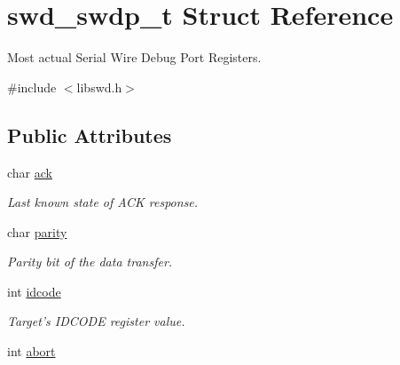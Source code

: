 \hypertarget{structswd__swdp__t}{
\section{swd\_\-swdp\_\-t Struct Reference}
\label{structswd__swdp__t}
}


Most actual Serial Wire Debug Port Registers.  




{\ttfamily \#include $<$libswd.h$>$}

\subsection*{Public Attributes}
\begin{DoxyCompactItemize}
\item 
\hypertarget{structswd__swdp__t_a070bf19c81fcf7467cf56b25d0e5a4cf}{
char \hyperlink{structswd__swdp__t_a070bf19c81fcf7467cf56b25d0e5a4cf}{ack}}
\label{structswd__swdp__t_a070bf19c81fcf7467cf56b25d0e5a4cf}

\begin{DoxyCompactList}\small\item\em Last known state of ACK response. \item\end{DoxyCompactList}\item 
\hypertarget{structswd__swdp__t_ad2b92d409367acae0566fbd5be7a8ea5}{
char \hyperlink{structswd__swdp__t_ad2b92d409367acae0566fbd5be7a8ea5}{parity}}
\label{structswd__swdp__t_ad2b92d409367acae0566fbd5be7a8ea5}

\begin{DoxyCompactList}\small\item\em Parity bit of the data transfer. \item\end{DoxyCompactList}\item 
\hypertarget{structswd__swdp__t_a59d78f5e5b3b2576a1ea04720bafb310}{
int \hyperlink{structswd__swdp__t_a59d78f5e5b3b2576a1ea04720bafb310}{idcode}}
\label{structswd__swdp__t_a59d78f5e5b3b2576a1ea04720bafb310}

\begin{DoxyCompactList}\small\item\em Target's IDCODE register value. \item\end{DoxyCompactList}\item 
\hypertarget{structswd__swdp__t_a25c097b84323315a910294429e579e2c}{
int \hyperlink{structswd__swdp__t_a25c097b84323315a910294429e579e2c}{abort}}
\label{structswd__swdp__t_a25c097b84323315a910294429e579e2c}


\end{DoxyCompactItemize}
